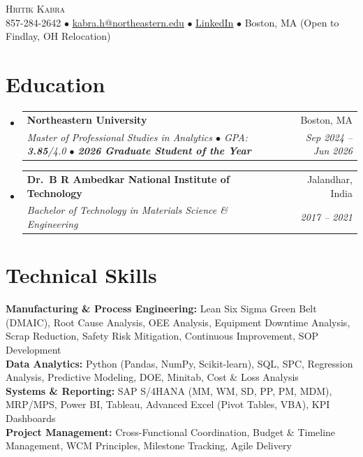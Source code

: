 \documentclass[letterpaper,10pt]{article}
\makeatletter
\newcommand{\resumeSubheading}[4]{
  \vspace{1pt}\item
    \begin{tabular*}{0.97\textwidth}[t]{l@{\extracolsep{\fill}}r}
      \textbf{#1} & #2 \\
      \textit{\small#3} & \textit{\small #4} \\
    \end{tabular*}\vspace{-4pt}
}
\newcommand{\resumeSubHeadingListStart}{\begin{itemize}[leftmargin=0.15in, label={}]}
\newcommand{\resumeSubHeadingListEnd}{\end{itemize}}
\makeatother
\begin{document}
\begin{center}
    {\Huge \scshape \color{heading} Hritik Kabra} \\ \vspace{2pt}
    \small 857-284-2642 $\bullet$
    \href{mailto:kabra.h@northeastern.edu}{\underline{kabra.h@northeastern.edu}} $\bullet$
    \href{https://www.linkedin.com/in/hritikkabra888}{\underline{LinkedIn}} $\bullet$
    Boston, MA (Open to Findlay, OH Relocation)
\end{center}

\section{Education}
\resumeSubHeadingListStart
\resumeSubheading
{Northeastern University}{Boston, MA}
{Master of Professional Studies in Analytics $\bullet$ GPA: \textbf{3.85}/4.0 $\bullet$ \textbf{2026 Graduate Student of the Year}}{Sep 2024 -- Jun 2026}
\resumeSubheading
{Dr.\ B R Ambedkar National Institute of Technology}{Jalandhar, India}
{Bachelor of Technology in Materials Science \& Engineering}{2017 -- 2021}
\resumeSubHeadingListEnd

\section{Technical Skills}
\begin{itemize}[leftmargin=0.15in, label={}]
\small{\item{
\textbf{Manufacturing \& Process Engineering:} Lean Six Sigma Green Belt (DMAIC), Root Cause Analysis, OEE Analysis, Equipment Downtime Analysis, Scrap Reduction, Safety Risk Mitigation, Continuous Improvement, SOP Development \\
\textbf{Data Analytics:} Python (Pandas, NumPy, Scikit-learn), SQL, SPC, Regression Analysis, Predictive Modeling, DOE, Minitab, Cost \& Loss Analysis \\
\textbf{Systems \& Reporting:} SAP S/4HANA (MM, WM, SD, PP, PM, MDM), MRP/MPS, Power BI, Tableau, Advanced Excel (Pivot Tables, VBA), KPI Dashboards \\
\textbf{Project Management:} Cross-Functional Coordination, Budget \& Timeline Management, WCM Principles, Milestone Tracking, Agile Delivery
}}
\end{itemize}
\end{document}
